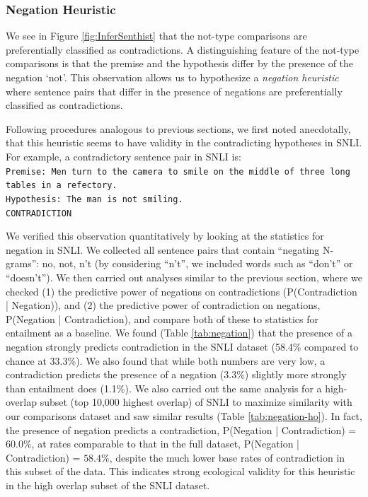 
\subsubsection{Negation Heuristic}
We see in Figure \ref{fig:InferSenthist} that the not-type comparisons are preferentially classified as contradictions. A distinguishing feature of the not-type comparisons is that the premise and the hypothesis differ by the presence of the negation `not'. This observation allows us to hypothesize a \textit{negation heuristic} where sentence pairs that differ in the presence of negations are preferentially classified as contradictions.

Following procedures analogous to previous sections, we first noted anecdotally, that this heuristic seems to have validity in the contradicting hypotheses in SNLI. For example, a contradictory sentence pair in SNLI is:\\
{\tt Premise: Men turn to the camera to smile on the middle of three long tables in a refectory. \\ Hypothesis:  The man is not smiling. \\ CONTRADICTION\\}

We verified this observation quantitatively by looking at the statistics for negation in SNLI. We collected all sentence pairs that contain ``negating N-grams'': no, not, n't (by considering ``n't'', we included words such as ``don't'' or ``doesn't''). We then carried out analyses similar to the previous section, where we checked (1) the predictive power of negations on contradictions (P(Contradiction | Negation)), and (2) the predictive power of contradiction on negations, P(Negation | Contradiction), and compare both of these to statistics for entailment as a baseline. We found (Table \ref{tab:negation}) that the presence of a negation strongly predicts contradiction in the SNLI dataset (58.4\% compared to chance at 33.3\%). We also found that while both numbers are very low, a contradiction predicts the presence of a negation (3.3\%) slightly more strongly than entailment does (1.1\%). We also carried out the same analysis for a high-overlap subset (top 10,000 highest overlap) of SNLI to maximize similarity with our comparisons dataset and saw similar results (Table \ref{tab:negation-ho}). In fact, the presence of negation predicts a contradiction, P(Negation | Contradiction) = $60.0\%$, at rates comparable to that in the full dataset, P(Negation | Contradiction) = $58.4\%$, despite the much lower base rates of contradiction in this subset of the data. This indicates strong ecological validity for this heuristic in the high overlap subset of the SNLI dataset.

